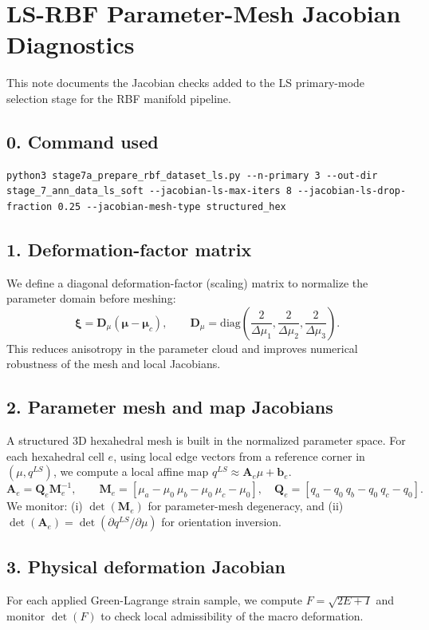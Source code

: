 \documentclass[11pt]{article}
\begin{document}
\section*{LS-RBF Parameter-Mesh Jacobian Diagnostics}
This note documents the Jacobian checks added to the LS primary-mode selection stage for the RBF manifold pipeline.
\subsection*{0. Command used}
\begin{verbatim}
python3 stage7a_prepare_rbf_dataset_ls.py --n-primary 3 --out-dir stage_7_ann_data_ls_soft --jacobian-ls-max-iters 8 --jacobian-ls-drop-fraction 0.25 --jacobian-mesh-type structured_hex
\end{verbatim}
\subsection*{1. Deformation-factor matrix}
We define a diagonal deformation-factor (scaling) matrix to normalize the parameter domain before meshing:
\begin{equation}
\boldsymbol{\xi} = \mathbf{D}_{\mu}(\boldsymbol{\mu}-\boldsymbol{\mu}_c),\qquad \mathbf{D}_{\mu} = \mathrm{diag}\!\left(\frac{2}{\Delta \mu_1},\frac{2}{\Delta \mu_2},\frac{2}{\Delta \mu_3}\right).
\end{equation}
This reduces anisotropy in the parameter cloud and improves numerical robustness of the mesh and local Jacobians.
\subsection*{2. Parameter mesh and map Jacobians}
A structured 3D hexahedral mesh is built in the normalized parameter space. For each hexahedral cell $e$, using local edge vectors from a reference corner in $(\mu,q^{LS})$, we compute a local affine map $q^{LS}\approx \mathbf{A}_e\mu+\mathbf{b}_e$.
\begin{equation}
\mathbf{A}_e = \mathbf{Q}_e\mathbf{M}_e^{-1},\qquad \mathbf{M}_e=[\mu_a-\mu_0\ \mu_b-\mu_0\ \mu_c-\mu_0],\quad \mathbf{Q}_e=[q_a-q_0\ q_b-q_0\ q_c-q_0].
\end{equation}
We monitor: (i) $\det(\mathbf{M}_e)$ for parameter-mesh degeneracy, and (ii) $\det(\mathbf{A}_e)=\det(\partial q^{LS}/\partial\mu)$ for orientation inversion.
\subsection*{3. Physical deformation Jacobian}
For each applied Green-Lagrange strain sample, we compute $F=\sqrt{2E+I}$ and monitor $\det(F)$ to check local admissibility of the macro deformation.
\end{document}
